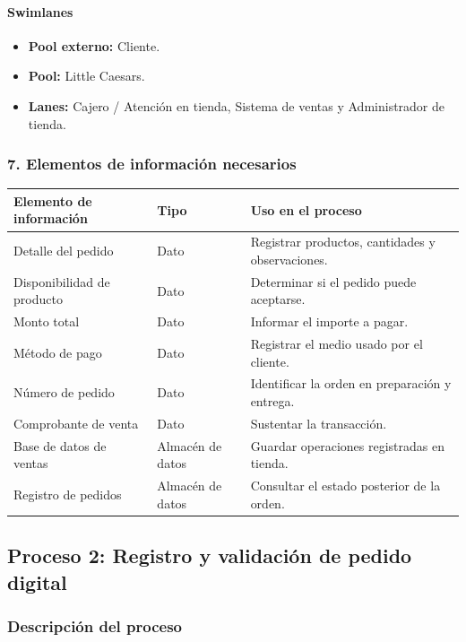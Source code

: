 \documentclass[a4paper,12pt]{article}
\begin{document}
\paragraph{Swimlanes}

\begin{itemize}
    \item \textbf{Pool externo:} Cliente.
    \item \textbf{Pool:} Little Caesars.
    \item \textbf{Lanes:} Cajero / Atención en tienda, Sistema de ventas y Administrador de tienda.
\end{itemize}

\subsubsection*{7. Elementos de información necesarios}

\begin{longtable}{P{5cm} P{5cm} P{4cm}}
\toprule
\textbf{Elemento de información} & \textbf{Tipo} & \textbf{Uso en el proceso} \\
\midrule
Detalle del pedido & Dato & Registrar productos, cantidades y observaciones. \\
Disponibilidad de producto & Dato & Determinar si el pedido puede aceptarse. \\
Monto total & Dato & Informar el importe a pagar. \\
Método de pago & Dato & Registrar el medio usado por el cliente. \\
Número de pedido & Dato & Identificar la orden en preparación y entrega. \\
Comprobante de venta & Dato & Sustentar la transacción. \\
Base de datos de ventas & Almacén de datos & Guardar operaciones registradas en tienda. \\
Registro de pedidos & Almacén de datos & Consultar el estado posterior de la orden. \\
\bottomrule
\end{longtable}

\subsection*{Proceso 2: Registro y validación de pedido digital}

\subsubsection*{Descripción del proceso}
\end{document}
